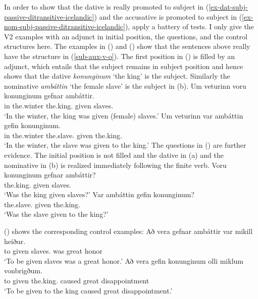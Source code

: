 In order to show that the dative is really promoted to subject in (\ref{ex-dat-subj-passive-ditransitive-icelandic}) and the accusative is
promoted to subject in (\ref{ex-nom-subj-passive-ditransitive-icelandic}), \citet*[]{ZMT85a} apply a battery of tests. I only give the
V2 examples with an adjunct in initial position, the questions, and the control structures here. The
examples in () and () show that the
sentences above really have the structure in (\ref{sub-aux-v-o}). The first position in () is
filled by an adjunct, which entails that the subject remains in subject position and hence shows
that the dative \emph{konunginum} `the king' is the subject. Similarly the nominative
\emph{ambáttin} `the female slave' is the subject in (b).
\eal
\ex
\gll Um veturinn voru konunginum gefnar ambáttir.\\
     in the.winter \AUX{} the.king.\DAT{} given slaves.\NOM\\\icelandic
\glt `In the winter, the king was given (female) slaves.'
\ex
\gll Um veturinn var ambáttin gefin konunginum.\\
     in the.winter \AUX{} the.slave.\NOM{} given the.king.\NOM\\
\glt `In the winter, the slave was given to the king.'
\zl
The questions in () are further evidence. The initial position is not filled and the dative
in (a) and the nominative in (b) is realized immediately following the finite verb.
\eal
\ex\label{ex-were-the-king-given-the-slaves}
\gll Voru konunginum gefnar ambáttir?\\
     \AUX{} the.king.\DAT{} given slaves.\NOM{}\\\icelandic
\glt `Was the king given slaves?'
\ex\label{ex-were-the-slaves-given-the-king}
\gll Var ambáttin gefin konunginum?\\
     \AUX{} the.slave.\NOM{} given the.king.\DAT\\
\glt `Was the slave given to the king?'
\zl

() shows the corresponding control examples:
\eal
\ex
\gll Að vera gefnar ambáttir var mikill heiður.\\
     to \AUX{} given slaves.\NOM{} was great honor\\\icelandic
\glt `To be given slaves was a great honor.'
\ex
\gll Að vera gefin konunginum olli miklum vonbrigðum.\\
     to \AUX{} given the.king.\DAT{} caused great disappointment\\
\glt `To be given to the king caused great disappointment.'


